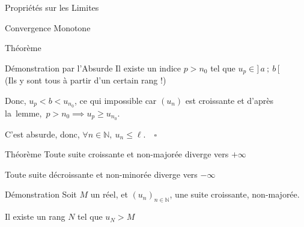 \documentclass{cours}
\begin{document}
\begin{Gpartie}{Propriétés sur les Limites}
\begin{Spartie}{Convergence Monotone}
\begin{SSpartie}{Théorème}
\begin{SSSpartie}{Démonstration par l'Absurde}
                    Il existe un indice $p>n_0$ tel que $u_p\in\big]\,a~;~b\,\big[$ \\ (Ils y sont tous à partir d'un certain rang !)

                    Donc, $u_p<b<u_{n_0}$, ce qui impossible car $(u_n)$ est croissante et d'après la~lemme,~$p>n_0\implies u_p\geq u_{n_0}$.

                    C'est absurde, donc, $\forall n\in\mathbb{N},~u_n\leq\ell$.$\quad\square$
                \end{SSSpartie}
            \end{SSpartie}
            \pagebreak
            \begin{SSpartie}{Théorème} 
                Toute suite croissante et non-majorée diverge vers $+\infty$

                Toute suite décroissante et non-minorée diverge vers $-\infty$

                \begin{SSSpartie}{Démonstration} 
                    Soit $M$ un réel, et $(u_n)_{n\in\mathbb{N}}$, une suite croissante, non-majorée.

                    Il existe un rang $N$ tel que $u_N>M$


\end{SSSpartie}
\end{SSpartie}
\end{Spartie}
\end{Gpartie}
\end{document}
